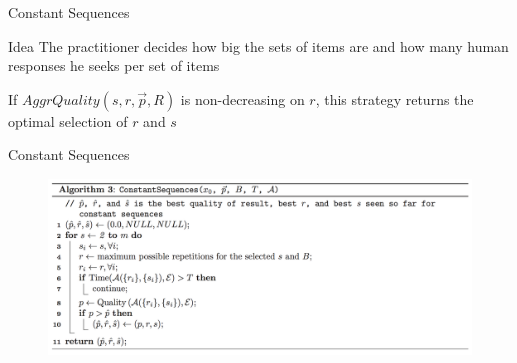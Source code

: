 \documentclass{beamer}
\begin{document}
\begin{frame}{Constant Sequences}
	\begin{block}{Idea}
		The practitioner decides how big the sets of items are and how many human responses he seeks per set of items
	\end{block}

	\begin{block}{}
		If $AggrQuality(s, r, \vec{p}, R)$ is non-decreasing on $r$, this strategy returns the optimal selection of $r$ and $s$ 	
	\end{block}
\end{frame}

\begin{frame}{Constant Sequences}

	\begin{figure}
		\centering
		\includegraphics[scale=0.33]{images/constant.png}
	\end{figure}	


\end{frame}
\end{document}
